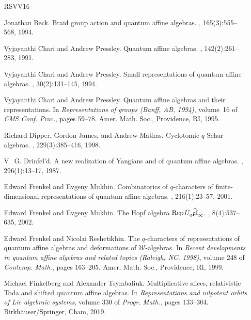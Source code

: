 \documentclass[12pt]{amsart}
\numberwithin{equation}{thm}
\newcounter{ni}
\begin{document}
\begin{thebibliography}{RSVV16}

Jonathan Beck.
\newblock Braid group action and quantum affine algebras.
, 165(3):555--568, 1994.

Vyjayanthi Chari and Andrew Pressley.
\newblock Quantum affine algebras.
, 142(2):261--283, 1991.

Vyjayanthi Chari and Andrew Pressley.
\newblock Small representations of quantum affine algebras.
, 30(2):131--145, 1994.

Vyjayanthi Chari and Andrew Pressley.
\newblock Quantum affine algebras and their representations.
\newblock In {\em Representations of groups ({B}anff, {AB}, 1994)}, volume~16
  of {\em CMS Conf. Proc.}, pages 59--78. Amer. Math. Soc., Providence, RI,
  1995.

Richard Dipper, Gordon James, and Andrew Mathas.
\newblock Cyclotomic {$q$}-{S}chur algebras.
, 229(3):385--416, 1998.

V.~G. Drinfel'd.
\newblock A new realization of {Y}angians and of quantum affine algebras.
, 296(1):13--17, 1987.

Edward Frenkel and Evgeny Mukhin.
\newblock Combinatorics of {$q$}-characters of finite-dimensional
  representations of quantum affine algebras.
, 216(1):23--57, 2001.

Edward Frenkel and Evgeny Mukhin.
\newblock The {H}opf algebra {${\rm Rep}\,U_q\widehat{\mathfrak g\mathfrak
  l}_\infty$}.
, 8(4):537--635, 2002.

Edward Frenkel and Nicolai Reshetikhin.
\newblock The {$q$}-characters of representations of quantum affine algebras
  and deformations of {$\mathscr W$}-algebras.
\newblock In {\em Recent developments in quantum affine algebras and related
  topics ({R}aleigh, {NC}, 1998)}, volume 248 of {\em Contemp. Math.}, pages
  163--205. Amer. Math. Soc., Providence, RI, 1999.

Michael Finkelberg and Alexander Tsymbaliuk.
\newblock Multiplicative slices, relativistic {T}oda and shifted quantum affine
  algebras.
\newblock In {\em Representations and nilpotent orbits of {L}ie algebraic
  systems}, volume 330 of {\em Progr. Math.}, pages 133--304.
  Birkh\"auser/Springer, Cham, 2019.


\end{thebibliography}
\end{document}
